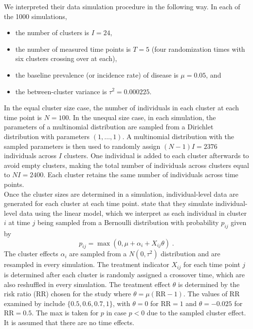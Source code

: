 \documentclass[10pt]{article}
\begin{document}
We interpreted their data simulation procedure in the following way. In each of the 1000 simulations,
\begin{itemize}

\item
the number of clusters is $I=24$,

\item
the number of measured time points is $T=5$ (four randomization times with six clusters crossing over at each),

\item
the baseline prevalence (or incidence rate) of disease is $\mu=0.05$, and

\item
the between-cluster variance is $\tau^2=0.000225$.

\end{itemize}
In the equal cluster size case, the number of individuals in each cluster at each time point is $N=100$. In the unequal size case, in each simulation, the parameters of a multinomial distribution are sampled from a Dirichlet distribution with parameters $(1,\ldots,1)$. A multinomial distribution with the sampled parameters is then used to randomly assign $(N-1)I=2376$ individuals across $I$ clusters. One individual is added to each cluster afterwards to avoid empty clusters, making the total number of individuals across clusters equal to $NI=2400$. Each cluster retains the same number of individuals across time points.
\\

Once the cluster sizes are determined in a simulation, individual-level data are generated for each cluster at each time point. \citeauthor{Hussey:2007} state that they simulate individual-level data using the linear model, which we interpret as each individual in cluster $i$ at time $j$ being sampled from a Bernoulli distribution with probability $p_{ij}$ given by
\[
p_{ij} = \max(0,\mu + \alpha_i + X_{ij}\theta) \;.
\]
The cluster effects $\alpha_i$ are sampled from a $N(0,\tau^2)$ distribution and are resampled in every simulation. The treatment indicator $X_{ij}$ for each time point $j$ is determined after each cluster is randomly assigned a crossover time, which are also reshuffled in every simulation. The treatment effect $\theta$ is determined by the risk ratio (RR) chosen for the study where $\theta=\mu(\text{RR}-1)$. The values of RR examined by \citeauthor{Hussey:2007} include $\{0.5,0.6,0.7,1\}$, with $\theta=0$ for $\text{RR}=1$ and $\theta=-0.025$ for $\text{RR}=0.5$. The max is taken for $p$ in case $p < 0$ due to the sampled cluster effect. It is assumed that there are no time effects.
\\
\end{document}
